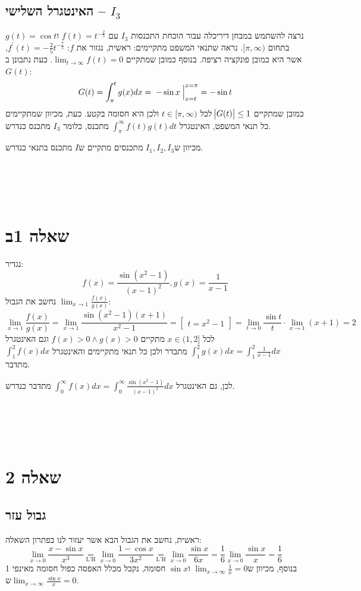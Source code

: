 \documentclass[11pt, oneside]{article}
\newcommand{\qed}{\R{$\blacksquare$}}
\newcommand{\br}{\\\\\\\\\\}
\newcommand{\ueq}[1]{\underset{\text{#1}}{=}}
\newcommand{\m}[3]{\R{משפט #3#2.#1}}
\newcommand{\defi}[3]{\int_{#1}^{#2} #3}
\newcommand{\evi}[3]{\eval[2]{\;#1\;}_{#2}^{#3}}
\newcommand{\subo}[1]{\begin{bmatrix} #1\end{bmatrix}}
\begin{document}
\subsection*{האינטגרל השלישי -- $I_{3}$}
נרצה להשתמש במבחן דיריכלה עבור הוכחת התכנסות $I_{3}$ עם $f(t) = t^{-\frac{2}{5}}$ ו$g(t) = \cos{t}$ בתחום $[\pi, \infty)$. נראה שתנאי המשפט מתקיימים: ראשית, נגזור את $f$: $f^{\prime}(t) = -\frac{2}{5}t^{-\frac{7}{5}}$, אשר היא כמובן פונקציה רציפה. בנוסף כמובן שמתקיים $\lim_{t \to \infty} f(t) = 0$. כעת נתבונן ב$G(t)$:
\[
G(t) = \defi{\pi}{t}{g(x)dx} = \evi{-\sin{x}}{x = t}{x = \pi} = -\sin{t}
\]
כמובן שמתקיים $\abs{G(t)} \le 1$ לכל $t \in [\pi, \infty)$ ולכן היא חסומה בקטע. כעת, מכיוון שמתקיימים כל תנאי המשפט, האינטגרל $\defi{\pi}{\infty}{f(t)g(t)dt}$ מתכנס, כלומר $I_{3}$ מתכנס כנדרש.

מכיוון ש$I_{1}, I_{2}, I_{3}$ מתכנסים מתקיים ש$I$ מתכנס בתנאי כנדרש.
\br\qed
\clearpage

\section*{שאלה 1ב}
נגדיר:
\[
f(x) = \frac{\sin({x^{2} - 1})}{(x - 1)^{2}}, g(x) = \frac{1}{x - 1}
\]
נחשב את הגבול $\lim_{x \to 1} \frac{f(x)}{g(x)}$:
\[
\lim_{x \to 1} \frac{f(x)}{g(x)}
= \lim_{x \to 1} \frac{\sin({x^{2} - 1})(x + 1)}{x^{2} - 1}
= \subo{t = x^{2} - 1}{}
= \lim_{t \to 0} \frac{\sin{t}}{t} \cdot \lim_{x \to 1} (x + 1) = 2
\]
לכל $x \in (1, 2]$ מתקיים $f(x) > 0 \land g(x) > 0$ וגם האינטגרל $\defi{1}{2}{g(x)dx} = \defi{1}{2}{\frac{1}{x - 1}dx}$ מתבדר ולכן כל תנאי \m{3}{5}{} מתקיימים והאינטגרל $\defi{1}{2}{f(x)dx}$ מתדבר.

לכן, גם האינטגרל $\defi{0}{\infty}{f(x)dx} = \defi{0}{\infty}{\frac{\sin({x^{2} - 1})}{(x - 1)^{2}}dx}$ מתדבר כנדרש.
\br\qed
\clearpage

\section*{שאלה 2}
\subsection*{גבול עזר}
ראשית, נחשב את הגבול הבא אשר יעזור לנו בפתרון השאלה:
\[
\lim_{x \to 0} \frac{x - \sin{x}}{x^{3}}
\ueq{L'H}
\lim_{x \to 0} \frac{1 - \cos{x}}{3x^{2}}
\ueq{L'H}
\lim_{x \to 0} \frac{\sin{x}}{6x}
= \frac{1}{6} \lim_{x \to 0} \frac{\sin{x}}{x} = \frac{1}{6}
\]
בנוסף, מכיוון ש$\lim_{x \to \infty} \frac{1}{x} = 0$ ו$\sin{x}$ חסומה, נקבל מכלל האפסה כפול חסומה מאינפי 1 ש$\lim_{x \to \infty} \frac{\sin{x}}{x} = 0$.
\end{document}
